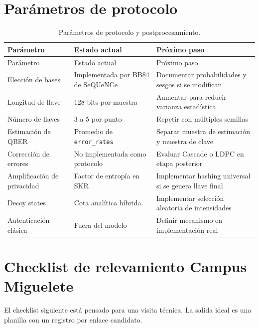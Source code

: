 \section{Parámetros de protocolo}

\begin{longtable}{p{}p{}p{}}
  \caption{Parámetros de protocolo y postprocesamiento.}
  \label{tab:parametros_protocolo}\\
  \toprule
  Parámetro & Estado actual & Próximo paso \\
  \midrule
  \endfirsthead
  \toprule
  Parámetro & Estado actual & Próximo paso \\
  \midrule
  \endhead
  Elección de bases & Implementada por BB84 de SeQUeNCe & Documentar probabilidades y sesgos si se modifican \\
  Longitud de llave & 128 bits por muestra & Aumentar para reducir varianza estadística \\
  Número de llaves & 3 a 5 por punto & Repetir con múltiples semillas \\
  Estimación de QBER & Promedio de \texttt{error\_rates} & Separar muestra de estimación y muestra de clave \\
  Corrección de errores & No implementada como protocolo & Evaluar Cascade o LDPC en etapa posterior \\
  Amplificación de privacidad & Factor de entropía en SKR & Implementar hashing universal si se genera llave final \\
  Decoy states & Cota analítica híbrida & Implementar selección aleatoria de intensidades \\
  Autenticación clásica & Fuera del modelo & Definir mecanismo en implementación real \\
  \bottomrule
\end{longtable}

\section{Checklist de relevamiento Campus Miguelete}

El checklist siguiente está pensado para una visita técnica. La salida ideal es una planilla con un registro por enlace candidato.

